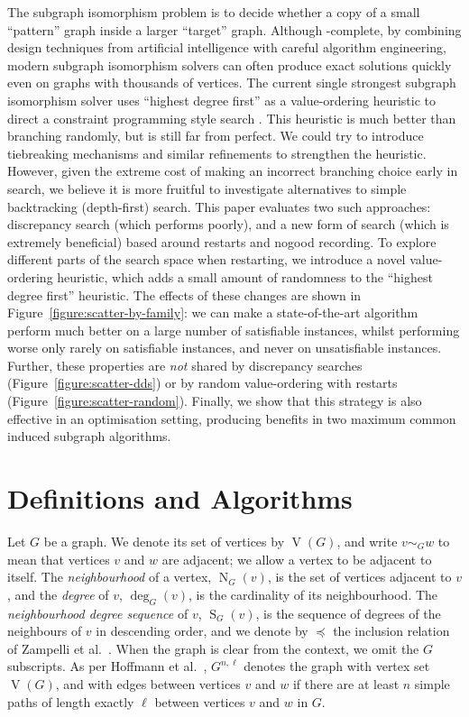 \documentclass[a4paper,UKenglish]{lipics-v2018}
\newcommand{\neighbourhood}{\operatorname{N}}
\newcommand{\vertexset}{\operatorname{V}}
\newcommand{\nds}{\operatorname{S}}
\newcommand{\figureref}[1]{Figure~\ref{#1}}
\begin{document}
The subgraph isomorphism problem is to decide whether a copy of a small ``pattern'' graph inside a
larger ``target'' graph. Although \NP-complete, by combining design techniques from artificial
intelligence with careful algorithm engineering, modern subgraph isomorphism solvers can often
produce exact solutions quickly even on graphs with thousands of vertices. The current single
strongest subgraph isomorphism solver uses ``highest degree first'' as a value-ordering heuristic to
direct a constraint programming style search
\cite{DBLP:conf/cp/McCreeshP15,DBLP:conf/lion/KotthoffMS16,DBLP:conf/ijcai/McCreeshPT16}. This
heuristic is much better than branching randomly, but is still far from perfect.  We could try to
introduce tiebreaking mechanisms and similar refinements to strengthen the heuristic. However, given
the extreme cost of making an incorrect branching choice early in search, we believe it is more
fruitful to investigate alternatives to simple backtracking (depth-first) search. This paper
evaluates two such approaches: discrepancy search (which performs poorly), and a new form of search
(which is extremely beneficial) based around restarts and nogood recording. To explore different
parts of the search space when restarting, we introduce a novel value-ordering heuristic, which adds
a small amount of randomness to the ``highest degree first'' heuristic.  The effects of these
changes are shown in \figureref{figure:scatter-by-family}: we can make a state-of-the-art algorithm
perform much better on a large number of satisfiable instances, whilst performing worse only rarely
on satisfiable instances, and never on unsatisfiable instances.  Further, these properties are
\emph{not} shared by discrepancy searches (\figureref{figure:scatter-dds}) or by random
value-ordering with restarts (\figureref{figure:scatter-random}). Finally, we show that this
strategy is also effective in an optimisation setting, producing benefits in two maximum common
induced subgraph algorithms.

\section{Definitions and Algorithms}

Let $G$ be a graph. We denote its set of vertices by $\vertexset(G)$, and write $v \sim_G w$ to mean
that vertices $v$ and $w$ are adjacent; we allow a vertex to be adjacent to itself. The
\emph{neighbourhood} of a vertex, $\neighbourhood_G(v)$, is the set of vertices adjacent to $v$, and
the \emph{degree} of $v$, $\deg_G(v)$, is the cardinality of its neighbourhood. The
\emph{neighbourhood degree sequence} of $v$, $\nds_G(v)$, is the sequence of degrees of the
neighbours of $v$ in descending order, and we denote by $\preceq$ the inclusion relation of
Zampelli et al.\ \cite{DBLP:journals/constraints/ZampelliDS10}. When the graph is clear from the context, we omit
the $G$ subscripts. As per Hoffmann et al.\ \cite{DBLP:conf/aaai/HoffmannMR17}, $G^{n,\ell}$ denotes the graph with
vertex set $\vertexset(G)$, and with edges between vertices $v$ and $w$ if there are at least $n$
simple paths of length exactly $\ell$ between vertices $v$ and $w$ in $G$.
\end{document}

